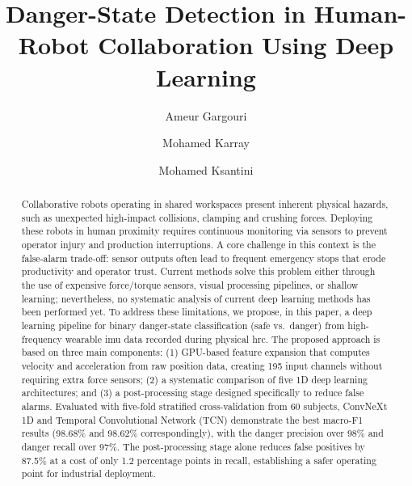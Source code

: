 \documentclass[a4paper,fleqn]{cas-sc}
\begin{document}
\let\WriteBookmarks\relax
\def\floatpagepagefraction{1}
\def\textpagefraction{.001}


\title [mode = title]{Danger-State Detection in Human-Robot Collaboration Using Deep Learning}

\author[1,2]{Ameur Gargouri}

\author[2]{Mohamed Karray}
\cormark[1]

\author[1]{Mohamed Ksantini}




\begin{abstract}
    Collaborative robots operating in shared workspaces present inherent physical hazards, such as unexpected high-impact collisions, clamping and crushing forces. Deploying these robots in human proximity requires continuous monitoring via sensors to prevent operator injury and production interruptions. A core challenge in this context is the false-alarm trade-off: sensor outputs often lead to frequent emergency stops that erode productivity and operator trust. Current methods solve this problem either through the use of expensive force/torque sensors, visual processing pipelines, or shallow learning; nevertheless, no systematic analysis of current deep learning methods has been performed yet. To address these limitations, we propose, in this paper, a deep learning pipeline for binary danger-state classification (safe vs.\ danger) from high-frequency wearable \ac{imu} data recorded during physical \ac{hrc}. The proposed approach is based on three main components: (1) GPU-based feature expansion that computes velocity and acceleration from raw position data, creating 195 input channels without requiring extra force sensors; (2) a systematic comparison of five 1D deep learning architectures; and (3) a post-processing stage designed specifically to reduce false alarms. Evaluated with five-fold stratified cross-validation from 60 subjects, ConvNeXt 1D and Temporal Convolutional Network (TCN) demonstrate the best macro-F1 results (98.68\% and 98.62\% correspondingly), with the danger precision over 98\% and danger recall over 97\%. The post-processing stage alone reduces false positives by 87.5\% at a cost of only 1.2 percentage points in recall, establishing a safer operating point for industrial deployment.
\end{abstract}
\end{document}
